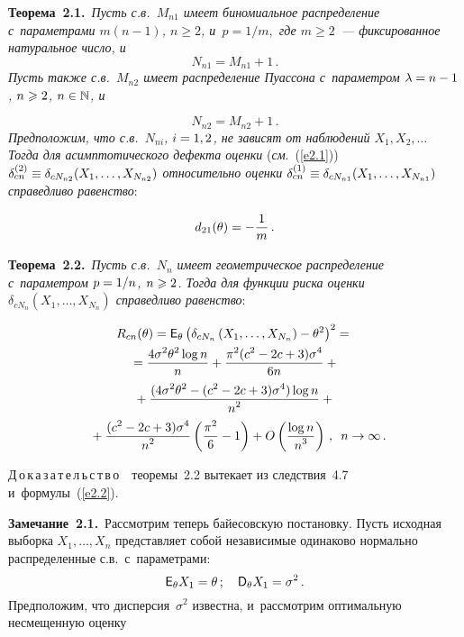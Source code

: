 \begin{multicols}{2}
\smallskip

\noindent
\textbf{Теорема~2.1.}\ \textit{Пусть с.в.~$M_{n1}$ имеет 
биномиальное распределение с~параметрами $m(n-1)$, $n \geqslant 2$, и~$p = 1/m,$ 
где $m \geqslant 2$~--- фиксированное натуральное число, и}
$$
N_{n1} = M_{n1} + 1\,.
$$
\textit{Пусть также с.в.~$M_{n2}$ имеет распределение Пуассона 
с~параметром $\lambda\hm = n\hm - 1$,
$n\hm \geqslant 2$, $n\hm \in \mathbb{N}$, и}

\noindent
$$
N_{n2} = M_{n2} + 1\,.
$$
\textit{Предположим, что с.в.~$N_{ni}$,
$i\hm = 1,2$, не зависят от наблюдений $X_1, X_2,\ldots$
Тогда для асимптотического дефекта оценки} (\textit{см}.~(\ref{e2.1})) 
$\delta_{cn}^{(2)}\hm \equiv \delta_{cN_{n2}}(X_1,\ldots,X_{N_{n2}})$ 
\textit{относительно оценки $\delta_{cn}^{(1)}\hm \equiv 
\delta_{cN_{n1}}(X_1,\ldots,X_{N_{n1}})$ справедливо равенство}:

\noindent
$$
d_{21}(\theta) = - \displaystyle\frac{\displaystyle 1\mathstrut}{\displaystyle m\mathstrut}\,.
$$

\noindent
\textbf{Теорема~2.2.}\
\textit{Пусть с.в.~$N_n$ имеет геометрическое распределение 
с~параметром $p\hm= 1/n$, $n\hm\geqslant 2$.
Тогда для функции риска оценки $\delta_{cN_n}(X_1,\ldots,X_{N_n})$ 
справедливо равенство}:

\noindent
\begin{multline*}
R_{cn}(\theta) = {\sf E}_\theta\left(\delta_{cN_n}
\left(X_1,\ldots,X_{N_n}\right) - \theta^2\right)^2 ={}
\\
{}= \displaystyle\frac{\displaystyle 4\sigma^2\theta^2 \log n\mathstrut}{\displaystyle n\mathstrut} +\displaystyle\frac{\displaystyle \pi^2 (c^2 - 2c + 3)\sigma^4\mathstrut}{\displaystyle 6n\mathstrut} +{}\\
{}+
 \displaystyle\frac{\displaystyle (4\sigma^2\theta^2 - (c^2 - 2c + 3)\sigma^4) \log n\mathstrut}{\displaystyle n^2\mathstrut} +{}
\\
{}+ \displaystyle\frac{\displaystyle (c^2 - 2c + 3)\sigma^4\mathstrut}{\displaystyle n^2\mathstrut} \left(\displaystyle\frac{\displaystyle \pi^2\mathstrut}{\displaystyle 6\mathstrut} - 1\right) + 
O\left(\displaystyle\frac{\displaystyle \log n\mathstrut}{\displaystyle n^3\mathstrut}\right)\,,\enskip  n \to \infty\,.\hspace*{-5.3156pt}
\end{multline*}

\noindent
Д\,о\,к\,а\,з\,а\,т\,е\,л\,ь\,с\,т\,в\,о~~теоремы~2.2 вытекает из 
следствия~4.7~\cite{2-ben} и~формулы~(\ref{e2.2}).

\smallskip

\noindent
\textbf{Замечание~2.1.}\
Рассмотрим теперь байесовскую постановку. Пусть исходная выборка $X_1,\ldots,X_n$ 
представляет собой независимые одинаково нормально распределенные с.в.\
с~параметрами:
$$
{\sf E}_\theta X_1 = \theta\,;\quad {\sf D}_\theta X_1 = \sigma^2\,.
$$
Предположим, что дисперсия~$\sigma^2$ известна, и~рассмотрим оптимальную 
несмещенную оценку


\end{multicols}
